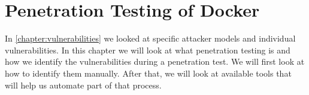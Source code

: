 \chapter{Penetration Testing of Docker}\label{chapter:pentesting}
In \autoref{chapter:vulnerabilities} we looked at specific attacker models and individual vulnerabilities. In this chapter we will look at what penetration testing is and how we identify the vulnerabilities during a penetration test. We will first look at how to identify them manually. After that, we will look at available tools that will help us automate part of that process.




